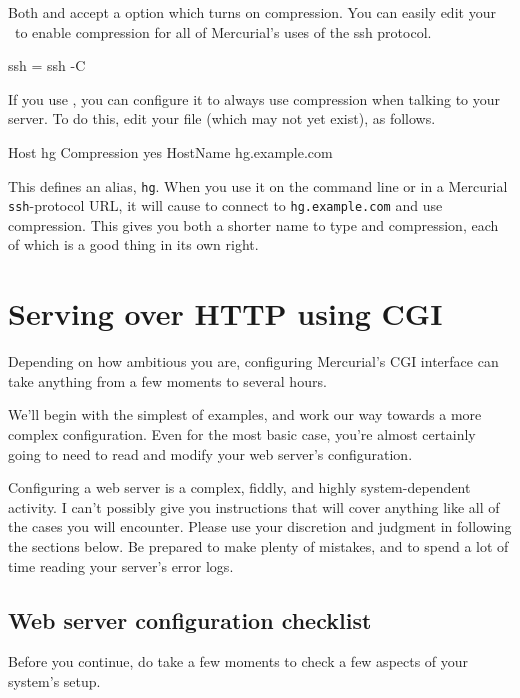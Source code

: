 Both  and  accept a 
option which turns on compression.  You can easily edit your \hgrc\ to
enable compression for all of Mercurial's uses of the ssh protocol.
\begin{codesample2}
  [ui]
  ssh = ssh -C
\end{codesample2}

If you use , you can configure it to always use
compression when talking to your server.  To do this, edit your
 file (which may not yet exist), as follows.
\begin{codesample2}
  Host hg
    Compression yes
    HostName hg.example.com
\end{codesample2}
This defines an alias, \texttt{hg}.  When you use it on the
 command line or in a Mercurial \texttt{ssh}-protocol
URL, it will cause  to connect to \texttt{hg.example.com}
and use compression.  This gives you both a shorter name to type and
compression, each of which is a good thing in its own right.

\section{Serving over HTTP using CGI}
\label{sec:collab:cgi}

Depending on how ambitious you are, configuring Mercurial's CGI
interface can take anything from a few moments to several hours.

We'll begin with the simplest of examples, and work our way towards a
more complex configuration.  Even for the most basic case, you're
almost certainly going to need to read and modify your web server's
configuration.

\begin{note}
  Configuring a web server is a complex, fiddly, and highly
  system-dependent activity.  I can't possibly give you instructions
  that will cover anything like all of the cases you will encounter.
  Please use your discretion and judgment in following the sections
  below.  Be prepared to make plenty of mistakes, and to spend a lot
  of time reading your server's error logs.
\end{note}

\subsection{Web server configuration checklist}

Before you continue, do take a few moments to check a few aspects of
your system's setup.

